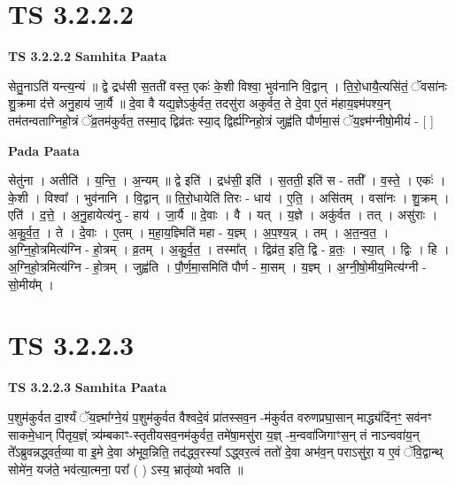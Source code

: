 \documentclass[17pt]{extarticle}
\begin{document}

\section{ TS 3.2.2.2 }

\textbf{TS 3.2.2.2 } \newline
\textbf{Samhita Paata} \newline

सेतु॒नाऽति॑ यन्त्य॒न्यं ॥ द्वे द्रध॑सी स॒तती॑ वस्त॒ एकः॑ के॒शी विश्वा॒ भुव॑नानि वि॒द्वान् । ति॒रो॒धायै॒त्यसि॑तं॒ ॅवसा॑नः शु॒क्रमा द॑त्ते अनु॒हाय॑ जा॒र्यै ॥ दे॒वा वै यद्य॒ज्ञेऽकु॑र्वत॒ तदसु॑रा अकुर्वत॒ ते दे॒वा ए॒तं म॑हाय॒ज्ञ्म॑पश्य॒न् तम॑तन्वताग्निहो॒त्रं ॅव्र॒तम॑कुर्वत॒ तस्मा॒द् द्विव्र॑तः स्या॒द् द्विर्ह्य॑ग्निहो॒त्रं जुह्व॑ति पौर्णमा॒सं ॅय॒ज्ञ्म॑ग्नीषो॒मीयं॑ - [  ] \newline

\textbf{Pada Paata} \newline

सेतु॑ना । अतीति॑ । य॒न्ति॒ । अ॒न्यम् ॥ द्वे इति॑ । द्रध॑सी॒ इति॑ । स॒तती॒ इति॑ स - तती᳚ । व॒स्ते॒ । एकः॑ । के॒शी । विश्वा᳚ । भुव॑नानि । वि॒द्वान् ॥ ति॒रो॒धायेति॑ तिरः - धाय॑ । ए॒ति॒ । असि॑तम् । वसा॑नः । शु॒क्रम् । एति॑ । द॒त्ते॒ । अ॒नु॒हायेत्य॑नु - हाय॑ । जा॒र्यै ॥ दे॒वाः । वै । यत् । य॒ज्ञे । अकु॑र्वत । तत् । असु॑राः । अ॒कु॒र्व॒त॒ । ते । दे॒वाः । ए॒तम् । म॒हा॒य॒ज्ञ्मिति॑ महा - य॒ज्ञ्म् । अ॒प॒श्य॒न्न् । तम् । अ॒त॒न्व॒त॒ । अ॒ग्नि॒हो॒त्रमित्य॑ग्नि - हो॒त्रम् । व्र॒तम् । अ॒कु॒र्व॒त॒ । तस्मा᳚त् । द्विव्र॑त॒ इति॒ द्वि - व्र॒तः॒ । स्या॒त् । द्विः । हि । अ॒ग्नि॒हो॒त्रमित्य॑ग्नि - हो॒त्रम् । जुह्व॑ति । पौ॒र्ण॒मा॒समिति॑ पौर्ण - मा॒सम् । य॒ज्ञ्म् । अ॒ग्नी॒षो॒मीय॒मित्य॑ग्नी - सो॒मीय᳚म् ।  \newline





\section{ TS 3.2.2.3 }

\textbf{TS 3.2.2.3 } \newline
\textbf{Samhita Paata} \newline

प॒शुम॑कुर्वत दा॒र्श्यं ॅय॒ज्ञ्मा᳚ग्ने॒यं प॒शुम॑कुर्वत वैश्वदे॒वं प्रा॑तस्सव॒न -म॑कुर्वत वरुणप्रघा॒सान् माद्ध्य॑दिंनꣳ॒॒ सव॑नꣳ साकमे॒धान् पि॑तृय॒ज्ञ्ं त्र्य॑म्बकाꣳ-स्तृतीयसव॒नम॑कुर्वत॒ तमे॑षा॒मसु॑रा य॒ज्ञ् -म॒न्ववा॑जिगाꣳस॒न् तं नाऽन्ववा॑य॒न् ते᳚ऽब्रुवन्नद्ध्वर्त॒व्या वा इ॒मे दे॒वा अ॑भूव॒न्निति॒ तद॑द्ध्व॒रस्या᳚ ऽद्ध्वर॒त्वं ततो॑ दे॒वा अभ॑व॒न् पराऽसु॑रा॒ य ए॒वं ॅवि॒द्वान्थ् सोमे॑न॒ यज॑ते॒ भव॑त्या॒त्मना॒ परा᳚ ( ) ऽस्य॒ भ्रातृ॑व्यो भवति ॥ \newline
\end{document}
